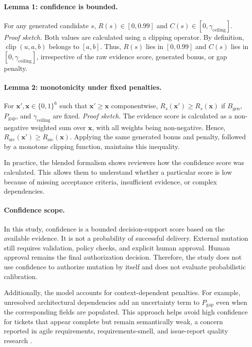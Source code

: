 \documentclass[manuscript,review]{acmart}
\begin{document}
\paragraph{Lemma 1: confidence is bounded.}
For any generated candidate $s$, $R(s)\in[0,0.99]$ and $C(s)\in[0,\gamma_{\text{ceiling}}]$.
\textit{Proof sketch.}
Both values are calculated using a clipping operator. By definition, $\operatorname{clip}(u,a,b)$ belongs to $[a,b]$. Thus, $R(s)$ lies in $[0,0.99]$ and $C(s)$ lies in $[0,\gamma_{\text{ceiling}}]$, irrespective of the raw evidence score, generated bonus, or gap penalty.

\paragraph{Lemma 2: monotonicity under fixed penalties.}
For $\mathbf{x}',\mathbf{x}\in\{0,1\}^6$ such that $\mathbf{x}'\ge\mathbf{x}$ componentwise, $R_s(\mathbf{x}')\ge R_s(\mathbf{x})$ if $B_{\text{gen}}$, $P_{\text{gap}}$, and $\gamma_{\text{ceiling}}$ are fixed.
\textit{Proof sketch.}
The evidence score is calculated as a non-negative weighted sum over $\mathbf{x}$, with all weights being non-negative. Hence, $R_{\text{src}}(\mathbf{x}')\ge R_{\text{src}}(\mathbf{x})$. Applying the same generated bonus and penalty, followed by a monotone clipping function, maintains this inequality.

In practice, the blended formalism shows reviewers how the confidence score was calculated. This allows them to understand whether a particular score is low because of missing acceptance criteria, insufficient evidence, or complex dependencies.

\paragraph{Confidence scope.}
In this study, confidence is a bounded decision-support score based on the available evidence. It is not a probability of successful delivery. External mutation still requires validation, policy checks, and explicit human approval. Human approval remains the final authorization decision. Therefore, the study does not use confidence to authorize mutation by itself and does not evaluate probabilistic calibration.

Additionally, the model accounts for context-dependent penalties. For example, unresolved architectural dependencies add an uncertainty term to $P_{\text{gap}}$ even when the corresponding fields are populated. This approach helps avoid high confidence for tickets that appear complete but remain semantically weak, a concern reported in agile requirements, requirements-smell, and issue-report quality research \cite{R65,R52,R53}.
\end{document}
